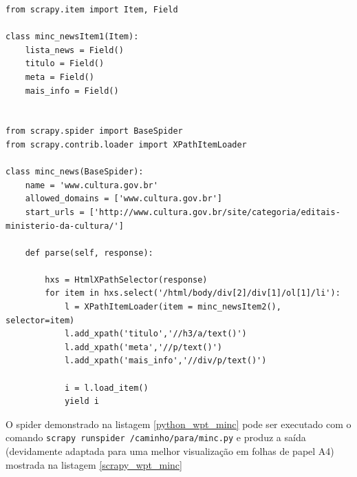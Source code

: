 \pagebreak
{}
\begin{lstlisting}[label=python_wpt_minc]
from scrapy.item import Item, Field

class minc_newsItem1(Item):
    lista_news = Field()
    titulo = Field()
    meta = Field()
    mais_info = Field()


from scrapy.spider import BaseSpider
from scrapy.contrib.loader import XPathItemLoader

class minc_news(BaseSpider):
    name = 'www.cultura.gov.br'
    allowed_domains = ['www.cultura.gov.br']
    start_urls = ['http://www.cultura.gov.br/site/categoria/editais-ministerio-da-cultura/']

    def parse(self, response):
        
        hxs = HtmlXPathSelector(response)
        for item in hxs.select('/html/body/div[2]/div[1]/ol[1]/li'):
            l = XPathItemLoader(item = minc_newsItem2(), selector=item)
            l.add_xpath('titulo','//h3/a/text()')
            l.add_xpath('meta','//p/text()')
            l.add_xpath('mais_info','//div/p/text()')

            i = l.load_item()
            yield i

\end{lstlisting}


O spider demonstrado na listagem \ref{python_wpt_minc} pode ser executado com o comando \texttt{scrapy runspider /caminho/para/minc.py} e produz a saída (devidamente adaptada para uma melhor visualização em folhas de papel A4) mostrada na listagem \ref{scrapy_wpt_minc}

